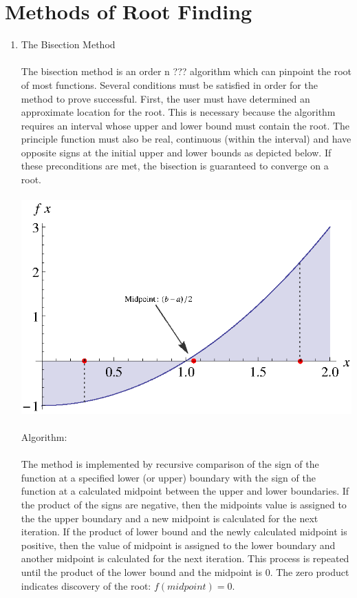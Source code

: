 \documentclass{report}
\begin{document}
\section{Methods of Root Finding}
\begin{enumerate}
\item The Bisection Method
\\
\\The bisection method is an order n ??? algorithm which can pinpoint the root of most functions. Several conditions must be satisfied in order for the method to prove successful. First, the user must have determined an approximate location for the root. This is necessary because the algorithm requires an interval whose upper and lower bound must contain the root. The principle function must also be real, continuous (within the interval) and have opposite signs at the initial upper and lower bounds as depicted below. If these preconditions are met, the bisection is guaranteed to converge on a root.
\\
\\\includegraphics[scale=1.3]{bisection.eps}
\\
\\Algorithm:  
\\
\\The method is implemented by recursive comparison of the sign of the function at a specified lower (or upper) boundary with the sign of the function at a calculated midpoint between the upper and lower boundaries. If the product of the signs are negative, then the midpoints value is assigned to the the upper boundary and a new midpoint is calculated for the next iteration. If the product of lower bound and the newly calculated midpoint is positive, then the value of midpoint is assigned to the lower boundary and another midpoint is calculated for the next iteration. This process is repeated until the product of the lower bound and the midpoint is $0$. The zero product indicates discovery of the root: $f(midpoint)=0$.

\end{enumerate}
\end{document}
